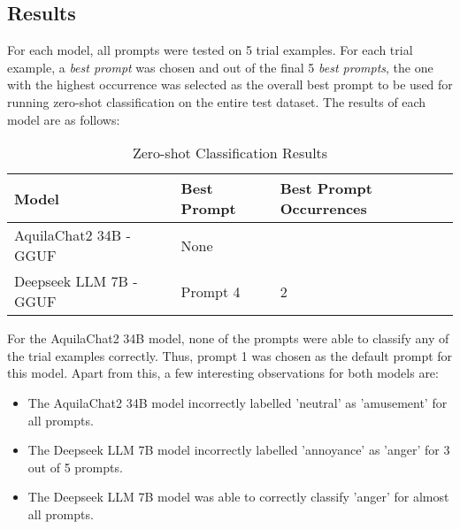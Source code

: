 \documentclass[titlepage]{article}
\begin{document}
\subsection{Results}
For each model, all prompts were tested on 5 trial examples. For each trial example, a \emph{best prompt} was chosen and out of 
the final 5 \emph{best prompts}, the one with the highest occurrence was selected as the overall best prompt to be used for running 
zero-shot classification on the entire test dataset. The results of each model are as follows:
\begin{table}[H] \label{tab:zero_shot_results}
    \centering
    \begin{tabular}{lll}
    \toprule
    \textbf{Model} & \textbf{Best Prompt} & \textbf{Best Prompt Occurrences} \\
    \midrule
    AquilaChat2 34B - GGUF & None &  \\
    Deepseek LLM 7B - GGUF & Prompt 4 & 2 \\
    \bottomrule
    \end{tabular}
    \caption{Zero-shot Classification Results}
\end{table}

For the AquilaChat2 34B model, none of the prompts were able to classify any of the trial examples correctly. Thus, prompt 1 was chosen 
as the default prompt for this model. Apart from this, a few interesting observations for both models are:
\begin{itemize}
    \item The AquilaChat2 34B model incorrectly labelled 'neutral' as 'amusement' for all prompts.
    \item The Deepseek LLM 7B model incorrectly labelled 'annoyance' as 'anger' for 3 out of 5 prompts.
    \item The Deepseek LLM 7B model was able to correctly classify 'anger' for almost all prompts.
\end{itemize}
\end{document}
